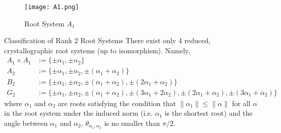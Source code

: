 \begin{figure}[h]
    \centering
    \texttt{[image: A1.png]}
    \caption{Root System $A_1$}
\end{figure}

\begin{namedtheorem}{Classification of Rank 2 Root Systems}
    There exist only 4 reduced, crystallographic root systems (up to isomorphism). Namely,
    \begin{equation*}
    \begin{aligned}
        A_1 \times A_1 &:= \{\pm \alpha_1, \pm \alpha_2 \} \\
        A_2 &:= \{\pm \alpha_1, \pm \alpha_2, \pm (\alpha_1 + \alpha_2) \} \\
        B_2 &:= \{\pm \alpha_1, \pm \alpha_2, \pm (\alpha_1 + \alpha_2), \pm (2 \alpha_1 + \alpha_2) \} \\
        G_2 &:= \{
            \pm \alpha_1,
            \pm \alpha_2,
            \pm (\alpha_1 + \alpha_2),
            \pm (3\alpha_1 + 2\alpha_2),
            \pm (2\alpha_1 + \alpha_2),
            \pm (3\alpha_1 + \alpha_2)
        \}
    \end{aligned}
    \end{equation*}
    where $\alpha_1$ and $\alpha_2$ are roots satisfying the condition that $\|\alpha_1\| \leq \|\alpha\|$ for all $\alpha$ in
    the root system under the induced norm (i.e. $\alpha_1$ is the shortest root) and the angle between $\alpha_1$ and $\alpha_2$,
    $\theta_{\alpha_1, \alpha_2}$ is no smaller than $\pi / 2$.
\end{namedtheorem}


